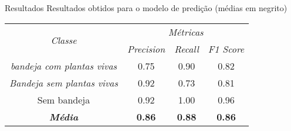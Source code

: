 \begin{frame}[t]{Resultados}
    Resultados obtidos para o modelo de predição (médias em negrito)
    \begin{table}[]
        \centering
        \begin{tabular}{cccc}
        \hline
        \multirow{2}{*}{\textit{Classe}}   & \multicolumn{3}{c}{\textit{Métricas}}                    \\ \cline{2-4} 
                                        & \textit{Precision} & \textit{Recall} & \textit{F1 Score} \\ \hline
        \textit{bandeja com plantas vivas} & 0.75               & 0.90            & 0.82              \\
        \textit{Bandeja sem plantas vivas} & 0.92               & 0.73            & 0.81              \\
        Sem bandeja                        & 0.92               & 1.00            & 0.96              \\
        \textit{\textbf{Média}}            & \textbf{0.86}      & \textbf{0.88}   & \textbf{0.86}     \\ \hline
        \end{tabular}
    \end{table}
\end{frame}